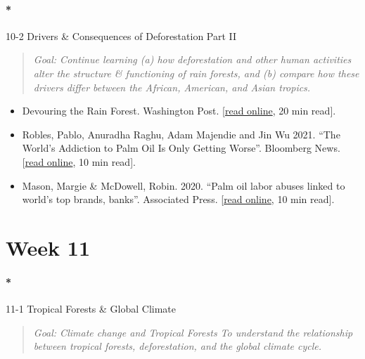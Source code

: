 \documentclass[
  10pt,
  letterpaper,
  oneside,
  open=any]{scrbook}
\let\oldparagraph\paragraph
\renewcommand{\paragraph}[1]{\oldparagraph{#1}\mbox{}}
\begin{document}
\paragraph*{10-2 Drivers \& Consequences of Deforestation Part
II}\label{drivers-consequences-of-deforestation-part-ii}

\begin{quote}
\emph{Goal: Continue learning (a) how deforestation and other human
activities alter the structure \& functioning of rain forests, and (b)
compare how these drivers differ between the African, American, and
Asian tropics.}
\end{quote}

\begin{itemize}
\item
  Devouring the Rain Forest. Washington Post.
  {[}\href{https://www.washingtonpost.com/world/interactive/2022/amazon-beef-deforestation-brazil/}{read
  online}, 20 min read{]}.
\item
  Robles, Pablo, Anuradha Raghu, Adam Majendie and Jin Wu 2021. ``The
  World's Addiction to Palm Oil Is Only Getting Worse''. Bloomberg News.
  {[}\href{https://www.bloomberg.com/graphics/2021-palm-oil-deforestation-climate-change/}{read
  online}, 10 min read{]}.
\item
  Mason, Margie \& McDowell, Robin. 2020. ``Palm oil labor abuses linked
  to world's top brands, banks''. Associated Press.
  {[}\href{https://apnews.com/article/virus-outbreak-only-on-ap-indonesia-financial-markets-malaysia-7b634596270cc6aa7578a062a30423bb}{read
  online}, 10 min read{]}.
\end{itemize}

\section*{Week 11}\label{week-11}


\paragraph*{11-1 Tropical Forests \& Global
Climate}\label{tropical-forests-global-climate}

\begin{quote}
\emph{Goal: Climate change and Tropical Forests To understand the
relationship between tropical forests, deforestation, and the global
climate cycle.}
\end{quote}
\end{document}
